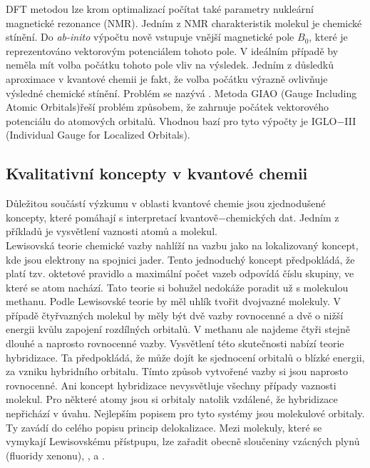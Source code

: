 \documentclass[
  digital, %
  table,   %
  lof,     %
  lot,     %
]{fithesis3}
\begin{document}
 DFT metodou lze krom optimalizací počítat také parametry nukleární magnetické rezonance (NMR). Jedním z NMR charakteristik molekul je chemické stínění. Do \textit{ab-inito} výpočtu nově vstupuje vnější magnetické pole $B_0$, které je reprezentováno vektorovým potenciálem tohoto pole. V ideálním případě by neměla mít volba počátku tohoto pole vliv na výsledek. Jedním z důsledků aproximace v kvantové chemii je fakt, že volba počátku výrazně ovlivňuje výsledné chemické stínění. Problém se nazývá . Metoda GIAO (Gauge  Including Atomic Orbitals)řeší problém způsobem, že zahrnuje počátek vektorového potenciálu do atomových orbitalů. Vhodnou bazí pro tyto výpočty je IGLO$-$III (Individual Gauge for Localized Orbitals).\cite{Standara2006thesis} \cite{g09}

\subsection{Kvalitativní koncepty v kvantové chemii}
Důležitou součástí výzkumu v oblasti kvantové chemie jsou zjednodušené koncepty, které pomáhají s interpretací kvantově$-$chemických dat. Jedním z příkladů je vysvětlení vaznosti atomů a molekul. \\
Lewisovská teorie chemické vazby nahlíží na vazbu jako na lokalizovaný koncept, kde jsou elektrony na spojnici jader. Tento jednoduchý koncept předpokládá, že platí tzv. oktetové pravidlo a maximální počet vazeb odpovídá číslu skupiny, ve které se atom nachází. Tato teorie si bohužel nedokáže poradit už s molekulou methanu. Podle Lewisovské teorie by měl uhlík tvořit dvojvazné molekuly. V případě čtyřvazných molekul by měly být dvě vazby rovnocenné a dvě o nižší energii kvůlu zapojení rozdílných orbitalů. V methanu ale najdeme čtyři stejně dlouhé a naprosto rovnocenné vazby. Vysvětlení této skutečnosti nabízí teorie hybridizace. Ta předpokládá, že může dojít ke sjednocení orbitalů o blízké energii, za vzniku hybridního orbitalu. Tímto způsob vytvořené vazby si jsou naprosto rovnocenné. Ani koncept hybridizace nevysvětluje všechny případy vaznosti molekul. Pro některé atomy jsou si orbitaly natolik vzdálené, že hybridizace nepřichází v úvahu. Nejlepším popisem pro tyto systémy jsou molekulové orbitaly. Ty zavádí do celého popisu princip delokalizace. Mezi molekuly, které se vymykají Lewisovskému přístpupu, lze zařadit obecně sloučeniny vzácných plynů (fluoridy xenonu),  ,  a . \\
\end{document}
